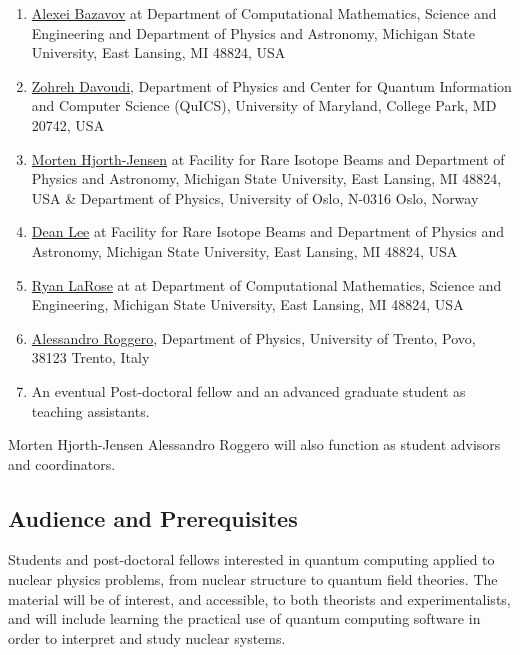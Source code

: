 \documentclass[twocolumn,superscriptaddress,amsmath,amssymb,aps,floatfix]{revtex4-2}
\begin{document}
\begin{enumerate}
\item 
\href{https://directory.natsci.msu.edu/Directory/Profiles/Person/101033}{Alexei
Bazavov} at Department of Computational Mathematics, Science and
Engineering and Department of Physics and Astronomy, Michigan State
University, East Lansing, MI 48824, USA
\item
  \href{https://umdphysics.umd.edu/people/faculty/current/item/927-davoudi.html}{Zohreh
  Davoudi}, Department of Physics and Center for Quantum Information and Computer Science (QuICS), University of Maryland, College Park,
  MD 20742, USA
\item
  \href{http://mhjgit.github.io/info/doc/web/}{Morten Hjorth-Jensen} at
  Facility for Rare Isotope Beams and Department of Physics and
  Astronomy, Michigan State University, East Lansing, MI 48824, USA \&
  Department of Physics, University of Oslo, N-0316 Oslo, Norway
\item
  \href{https://frib.msu.edu/for-students/faculty/lee-profile}{Dean Lee}
  at Facility for Rare Isotope Beams and Department of Physics and
  Astronomy, Michigan State University, East Lansing, MI 48824, USA
\item
  \href{https://www.ryanlarose.com/}{Ryan LaRose} at at Department of
  Computational Mathematics, Science and Engineering, Michigan State
  University, East Lansing, MI 48824, USA
\item
  \href{https://webapps.unitn.it/du/en/Persona/PER0016084/Didattica}{Alessandro
  Roggero}, Department of Physics, University of Trento, Povo, 38123
  Trento, Italy
\item
  An eventual Post-doctoral fellow and an advanced graduate student as
  teaching assistants.
\end{enumerate}

Morten Hjorth-Jensen Alessandro Roggero will also function as student
advisors and coordinators.

    \subsection{Audience and
Prerequisites}\label{audience-and-prerequisites}

Students and post-doctoral fellows interested in quantum computing
applied to nuclear physics problems, from nuclear structure to quantum
field theories. The material will be of interest, and accessible, to
both theorists and experimentalists, and will include learning the
practical use of quantum computing software in order to interpret and
study nuclear systems.
\end{document}
